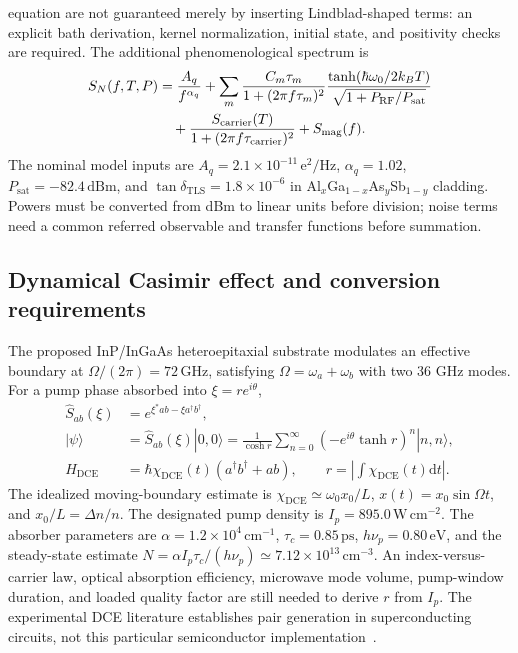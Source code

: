 \documentclass[11pt,a4paper]{article}
\newcommand{\dd}{\mathrm d}
\newcommand{\unit}[1]{\,\mathrm{#1}}
\begin{document}
equation are not guaranteed merely by inserting Lindblad-shaped terms: an explicit bath
derivation, kernel normalization, initial state, and positivity checks are required.
The additional phenomenological spectrum is
\begin{align}
 S_N(f,T,P)&=\frac{A_q}{f^{\alpha_q}}
 +\sum_m\frac{C_m\tau_m}{1+(2\pi f\tau_m)^2}
 \frac{\tanh(\hbar\omega_0/2k_BT)}{\sqrt{1+P_{\mathrm{RF}}/P_{\mathrm{sat}}}}\notag\\
 &\quad+\frac{S_{\mathrm{carrier}}(T)}{1+(2\pi f\tau_{\mathrm{carrier}})^2}
 +S_{\mathrm{mag}}(f).
\end{align}
The nominal model inputs are $A_q=2.1\times10^{-11}\unit{e^2/Hz}$, $\alpha_q=1.02$,
$P_{\mathrm{sat}}=-82.4\unit{dBm}$, and $\tan\delta_{\mathrm{TLS}}=1.8\times10^{-6}$ in
Al$_x$Ga$_{1-x}$As$_y$Sb$_{1-y}$ cladding. Powers must be converted from dBm to linear units
before division; noise terms need a common referred observable and transfer functions before summation.

\subsection{Dynamical Casimir effect and conversion requirements}
\label{sec:dce}
The proposed InP/InGaAs heteroepitaxial substrate modulates an effective boundary at
$\Omega/(2\pi)=72\unit{GHz}$, satisfying $\Omega=\omega_a+\omega_b$ with two 36 GHz modes.
For a pump phase absorbed into $\xi=re^{i\theta}$,
\begin{align}
 \hat S_{ab}(\xi)&=e^{\xi^*ab-\xi a^\dagger b^\dagger},\\
 |\psi\rangle&=\hat S_{ab}(\xi)|0,0\rangle
 =\frac{1}{\cosh r}\sum_{n=0}^{\infty}(-e^{i\theta}\tanh r)^n|n,n\rangle,\\
 H_{\mathrm{DCE}}&=\hbar\chi_{\mathrm{DCE}}(t)(a^\dagger b^\dagger+ab),\qquad
 r=\left|\int\chi_{\mathrm{DCE}}(t)\dd t\right|.
\end{align}
The idealized moving-boundary estimate is $\chi_{\mathrm{DCE}}\simeq\omega_0x_0/L$,
$x(t)=x_0\sin\Omega t$, and $x_0/L=\Delta n/n$. The designated pump density is
$I_p=895.0\unit{W\,cm^{-2}}$. The absorber parameters are
$\alpha=1.2\times10^4\unit{cm^{-1}}$, $\tau_c=0.85\unit{ps}$,
$h\nu_p=0.80\unit{eV}$, and the steady-state estimate
$N=\alpha I_p\tau_c/(h\nu_p)\simeq7.12\times10^{13}\unit{cm^{-3}}$.
An index-versus-carrier law, optical absorption efficiency, microwave mode volume, pump-window
duration, and loaded quality factor are still needed to derive $r$ from $I_p$.
The experimental DCE literature establishes pair generation in superconducting circuits,
not this particular semiconductor implementation~\cite{wilson}.
\end{document}
